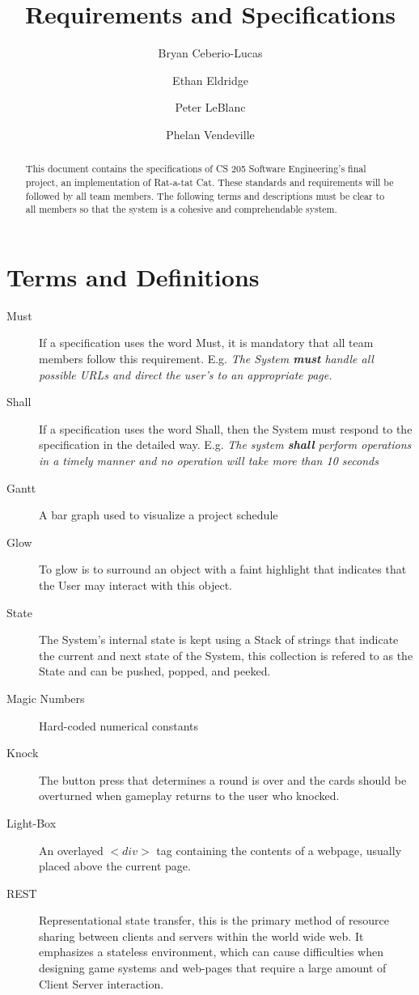\documentclass[12pt]{IEEEtran}
\title{Requirements and Specifications}
\author{Bryan Ceberio-Lucas \and Ethan Eldridge \and Peter LeBlanc \and Phelan Vendeville }
\begin{document}
\maketitle

\begin{abstract}
	This document contains the specifications of CS 205 Software  Engineering's final project, an implementation of Rat-a-tat Cat. These standards and requirements will be followed by all team members. The following terms and descriptions must be clear to all members so that the system is a cohesive and comprehendable system.
\end{abstract}

\tableofcontents

\section{Terms and Definitions}
\label{sec:TermsDefinitions}
	\begin{description}
		\item[Must] If a specification uses the word Must, it is mandatory that all team members follow this requirement. E.g.  \textit{The System \textbf{must} handle all possible URLs and direct the user's to an appropriate page.} 
		\item[Shall] If a specification uses the word Shall, then the System must respond to the specification in the detailed way. E.g. \textit{The system \textbf{shall} perform operations in a timely manner and no operation will take more than 10 seconds}
		\item[Gantt] A bar graph used to visualize a project schedule
		\item[Glow] To glow is to surround an object with a faint highlight that indicates that the User may interact with this object.
		\item[State] The System's internal state is kept using a Stack of strings that indicate the current and next state of the System, this collection is refered to as the State and can be pushed, popped, and 	peeked.
		\item[Magic Numbers] \hspace{4em} Hard-coded numerical constants 
		\item[Knock] \hspace{.5em} The button press that determines a round is over and the cards should be overturned when gameplay returns to the user who knocked.
		\item[Light-Box] \hspace{2em}An overlayed $<div>$ tag containing the contents of a webpage, usually placed above the current page.
		\item[REST] Representational state transfer, this is the primary method of resource sharing between clients and servers within the world wide web. It emphasizes a stateless environment, which can cause difficulties when designing game systems and web-pages that require a large amount of Client Server interaction.
	\end{description}
\end{document}
